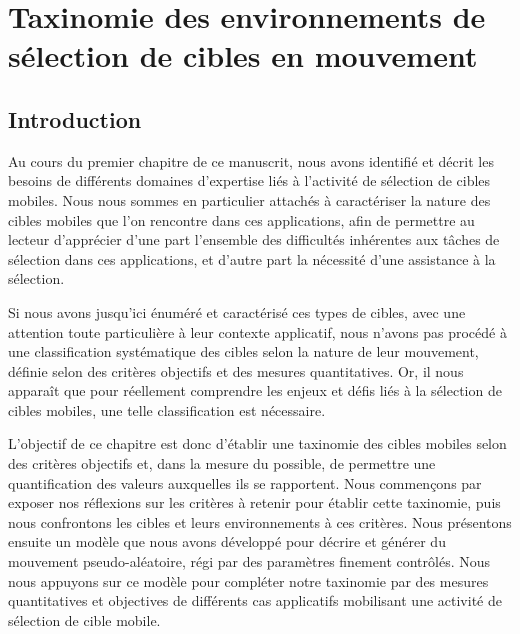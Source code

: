 
\chapter[Taxinomie des environnements de sélection]{Taxinomie des environnements de sélection de cibles en mouvement}
\minitoc
\label{chap3}
\clearpage


\section{Introduction}
	Au cours du premier chapitre de ce manuscrit, nous avons identifié et décrit les besoins de différents domaines d'expertise liés à l'activité de sélection de cibles mobiles. Nous nous sommes en particulier attachés à caractériser la nature des cibles mobiles que l'on rencontre dans ces applications, afin de permettre au lecteur d'apprécier d'une part l'ensemble des difficultés inhérentes aux tâches de sélection dans ces applications, et d'autre part la nécessité d'une assistance à la sélection.
	
	Si nous avons jusqu'ici énuméré et caractérisé ces types de cibles, avec une attention toute particulière à leur contexte applicatif, nous n'avons pas procédé à une classification systématique des cibles selon la nature de leur mouvement, définie selon des critères objectifs et des mesures quantitatives. Or, il nous apparaît que pour réellement comprendre les enjeux et défis liés à la sélection de cibles mobiles, une telle classification est nécessaire.
	
	L'objectif de ce chapitre est donc d'établir une taxinomie des cibles mobiles selon des critères objectifs et, dans la mesure du possible, de permettre une quantification des valeurs auxquelles ils se rapportent. Nous commençons par exposer nos réflexions sur les critères à retenir pour établir cette taxinomie, puis nous confrontons les cibles et leurs environnements à ces critères. Nous présentons ensuite un modèle que nous avons développé pour décrire et générer du mouvement pseudo-aléatoire, régi par des paramètres finement contrôlés. Nous nous appuyons sur ce modèle pour compléter notre taxinomie par des mesures quantitatives et objectives de différents cas applicatifs mobilisant une activité de sélection de cible mobile.	
	
